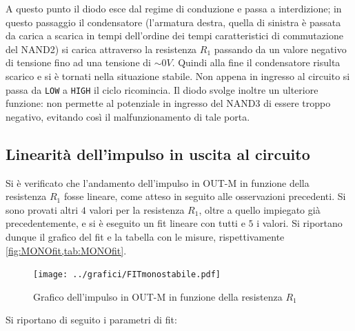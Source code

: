 \documentclass[a4paper,10pt]{article}
\def\code#1{\texttt{#1}}
\begin{document}
\newline
A questo punto il diodo esce dal regime di conduzione e passa a interdizione; in questo passaggio il condensatore (l'armatura destra, quella di sinistra è passata da carica a scarica in tempi dell'ordine dei tempi caratteristici di commutazione del NAND2) si carica attraverso la resistenza $R_1$ passando da un valore negativo di tensione fino ad una tensione di $\sim 0V$. Quindi alla fine il condensatore risulta scarico e si è tornati nella situazione stabile. Non appena in ingresso al circuito si passa da \code{LOW} a \code{HIGH} il ciclo ricomincia.
\newline
\newline
Il diodo svolge inoltre un ulteriore funzione: non permette al potenziale in ingresso del NAND3 di essere troppo negativo, evitando così il malfunzionamento di tale porta.


\subsection{Linearità dell'impulso in uscita al circuito}
Si è verificato che l'andamento dell'impulso in OUT-M in funzione della resistenza $R_1$ fosse lineare, come atteso in seguito alle osservazioni precedenti.
Si sono provati altri $4$ valori per la resistenza $R_1$, oltre a quello impiegato già precedentemente, e si è eseguito un fit lineare con tutti e $5$ i valori. Si riportano dunque il grafico del fit e la tabella con le misure, rispettivamente \cref{fig:MONOfit,tab:MONOfit}.

\begin{figure}[H]
	\centering
	\begin{minipage}{0.49\textwidth}
		\centering
		\texttt{[image: ../grafici/FITmonostabile.pdf]}
		\caption{Grafico dell'impulso in OUT-M in funzione della resistenza $R_1$}
		\label{fig:MONOfit}
	\end{minipage}
	\begin{minipage}{0.49\textwidth}
		\centering
		\resizebox{0.7\textwidth}{!}{
			}
		\label{tab:MONOfit}
	\end{minipage}
\end{figure}

Si riportano di seguito i parametri di fit:
\end{document}
